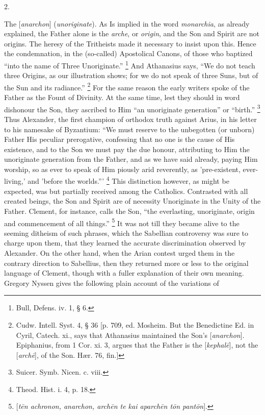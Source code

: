 2.

The [\emph{anarchon}] (\emph{unoriginate}). As Is implied in the
word \emph{monarchia}, as already explained, the Father alone is the \emph{arche},
or \emph{origin}, and the Son and Spirit are not origins. The heresy
of the Tritheists made it necessary to insist upon this. Hence the
condemnation, in the (so-called) Apostolical Canons, of those who
baptized ``into the name of Three Unoriginate.'' \footnote{Bull, Defens. iv. 1, § 6.} And Athanasius says, ``We do not teach three Origins, as
our illustration shows; for we do not speak of three Suns, but of the
Sun and its radiance.'' \footnote{Cudw. Intell. Syst. 4, § 36 [p. 709, ed.
Mosheim. But the Benedictine Ed. in Cyril, Catech. xi., says that
Athanasius maintained the Son's [\emph{anarchon}]. Epiphanius, from 1
Cor. xi. 3, argues that the Father is the [\emph{kephal\={e}}], not
the [\emph{arch\={e}}], of the Son. Hær. 76, fin.]}
For the same reason the early writers spoke of the Father as the Fount
of Divinity. At the same time, lest they should in word dishonour the
Son, they ascribed to Him ``an unoriginate generation'' or
``birth.'' \footnote{Suicer. Symb. Nicen. c. viii.} Thus
Alexander, the first champion of orthodox truth against Arius, in his
letter to his namesake of Byzantium: ``We must reserve to the
unbegotten (or unborn) Father His peculiar prerogative, confessing
that no one is the cause of His existence, and to the Son we must pay
the due honour, attributing to Him the unoriginate generation from the
Father, and as we have said already, paying Him worship, so as ever to
speak of Him piously arid reverently, as 'pre-existent, ever-living,'
and 'before the worlds.''' \footnote{Theod. Hist. i. 4, p. 18.}
This distinction however, as might be expected, was but partially
received among the Catholics. Contrasted with all created
beings, the Son and Spirit are of necessity Unoriginate in the Unity
of the Father. Clement, for instance, calls the Son, ``the
everlasting, unoriginate, origin and commencement of all things.''
\footnote{[\emph{t\={e}n achronon, anarchon, arch\={e}n
te kai aparch\={e}n t\={o}n pant\={o}n}].} It was not till they
became alive to the seeming ditheism of such phrases, which the
Sabellian controversy was sure to charge upon them, that they learned
the accurate discrimination observed by Alexander. On the other hand,
when the Arian contest urged them in the contrary direction to
Sabellius, then they returned more or less to the original language of
Clement, though with a fuller explanation of their own meaning.
Gregory Nyssen gives the following plain account of the variations of

